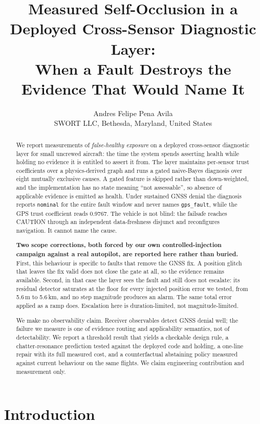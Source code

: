 \documentclass[11pt,a4paper]{article}
\title{Measured Self-Occlusion in a Deployed Cross-Sensor Diagnostic Layer:\\
When a Fault Destroys the Evidence That Would Name It}
\author{Andres Felipe Pena Avila\\
SWORT LLC, Bethesda, Maryland, United States}
\date{}
\newcommand{\code}[1]{\texttt{\small #1}}
\begin{document}
\maketitle

\begin{abstract}
We report measurements of \emph{false-healthy exposure} on a deployed
cross-sensor diagnostic layer for small uncrewed aircraft: the time the system
spends asserting health while holding no evidence it is entitled to assert it
from. The layer maintains per-sensor trust coefficients over a physics-derived
graph and runs a gated naive-Bayes diagnosis over eight mutually exclusive
causes. A gated feature is skipped rather than down-weighted, and the
implementation has no state meaning ``not assessable'', so absence of
applicable evidence is emitted as health. Under sustained GNSS denial the
diagnosis reports \code{nominal} for the entire fault window and never names
\code{gps\_fault}, while the GPS trust coefficient reads 0.9767. The vehicle is
not blind: the failsafe reaches CAUTION through an independent data-freshness
disjunct and reconfigures navigation. It cannot name the cause.

\textbf{Two scope corrections, both forced by our own controlled-injection
campaign against a real autopilot, are reported here rather than buried.}
First, this behaviour is specific to faults that remove the GNSS fix. A
position glitch that leaves the fix valid does not close the gate at all, so
the evidence remains available. Second, in that case the layer sees the fault
and still does not escalate: its residual detector saturates at the floor for
every injected position error we tested, from 5.6\,m to 5.6\,km, and no step
magnitude produces an alarm. The same total error applied as a ramp does.
Escalation here is duration-limited, not magnitude-limited.

We make no observability claim. Receiver observables detect GNSS denial well;
the failure we measure is one of evidence routing and applicability semantics,
not of detectability. We report a threshold result that yields a checkable
design rule, a chatter-resonance prediction tested against the deployed code
and holding, a one-line repair with its full measured cost, and a counterfactual
abstaining policy measured against current behaviour on the same flights. We
claim engineering contribution and measurement only.
\end{abstract}

\section{Introduction}
\label{sec:intro}
\end{document}

